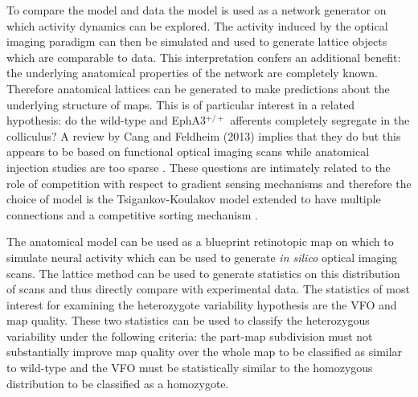 To compare the model and data the model is used as a network generator on which activity dynamics can be explored. The activity induced by the optical imaging paradigm can then be simulated and used to generate lattice objects which are comparable to data. This interpretation confers an additional benefit: the underlying anatomical properties of the network are completely known. Therefore anatomical lattices can be generated to make predictions about the underlying structure of maps. This is of particular interest in a related hypothesis: do the wild-type and EphA3$^{+/+}$ afferents completely segregate in the colliculus? A review by Cang and Feldheim (2013) implies that they do but this appears to be based on functional optical imaging scans while anatomical injection studies are too sparse \cite{Cang2013-dw}. These questions are intimately related to the role of competition with respect to gradient sensing mechanisms and therefore the choice of model is the Tsigankov-Koulakov model extended to have multiple connections and a competitive sorting mechanism \cite{Triplett2011-jk}. 

The anatomical model can be used as a blueprint retinotopic map on which to simulate neural activity which can be used to generate \textit{in silico} optical imaging scans. The lattice method can be used to generate statistics on this distribution of scans and thus directly compare with experimental data. The statistics of most interest for examining the heterozygote variability hypothesis are the VFO and map quality.  These two statistics can be used to classify the heterozygous variability under the following criteria: the part-map subdivision must not substantially improve map quality over the whole map to be classified as similar to wild-type and the VFO must be statistically similar to the homozygous distribution to be classified as a homozygote. 
